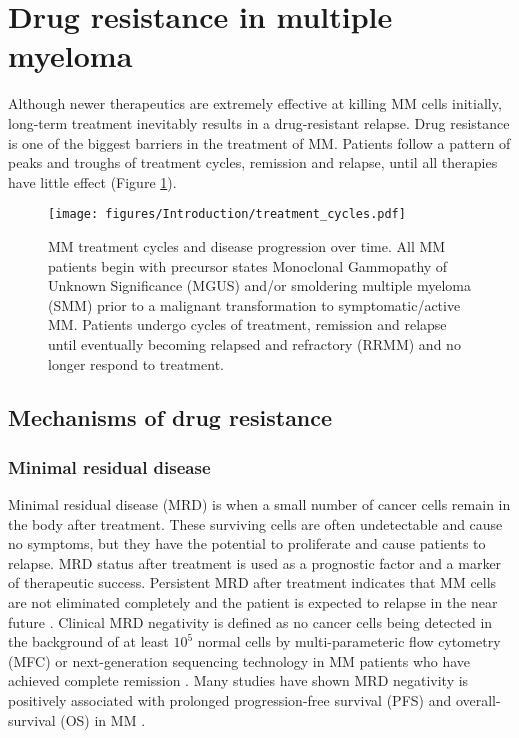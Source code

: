 \section{Drug resistance in multiple myeloma}
Although newer therapeutics are extremely effective at killing MM cells initially, long-term treatment inevitably results in a drug-resistant relapse.
Drug resistance is one of the biggest barriers in the treatment of MM\@.
Patients follow a pattern of peaks and troughs of treatment cycles, remission and relapse, until all therapies have little effect (Figure \ref{fig:treatment_cycles}).
\begin{figure}[htb]
\centering
\texttt{[image: figures/Introduction/treatment\_cycles.pdf]}
\caption[MM treatment cycles]{MM treatment cycles and disease progression over time.
All MM patients begin with precursor states Monoclonal Gammopathy of Unknown Significance (MGUS) and/or smoldering multiple myeloma (SMM) prior to a malignant transformation to symptomatic/active MM.
Patients undergo cycles of treatment, remission and relapse until eventually becoming relapsed and refractory (RRMM) and no longer respond to treatment.
}
\label{fig:treatment_cycles}
\end{figure}
\subsection{Mechanisms of drug resistance}


\subsubsection{Minimal residual disease}
Minimal residual disease (MRD) is when a small number of cancer cells remain in the body after treatment.
These surviving cells are often undetectable and cause no symptoms, but they have the potential to proliferate and cause patients to relapse.
MRD status after treatment is used as a prognostic factor and a marker of therapeutic success.
Persistent MRD after treatment indicates that MM cells are not eliminated completely and the patient is expected to relapse in the near future \cite{ding2021minimal}.
Clinical MRD negativity is defined as no cancer cells being detected in the background of at least $10^5$ normal cells by multi-parameteric flow cytometry (MFC) or next-generation sequencing technology in MM patients who have achieved complete remission \cite{kumar2016international}.
Many studies have shown MRD negativity is positively associated with prolonged progression-free survival (PFS) and overall-survival (OS) in MM \cite{paiva2008multiparameter, martinez2014prognostic, munshi2020large}.


